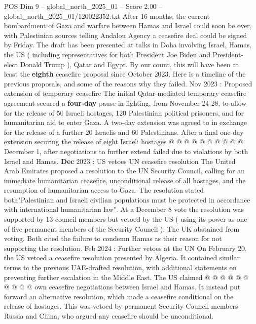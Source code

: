 \begin{textsample}{POS Dim 9 – global\_north\_2025\_01 – Score 2.00 – global\_north\_2025\_01/120022352.txt}  \label{ex:f9_pos_351}
After 16 months, the current bombardment of Gaza and warfare between Hamas and Israel could soon be over, with Palestinian sources telling Andalou Agency a ceasefire deal could be signed by Friday.
The draft has been presented at talks in Doha involving Israel, Hamas, the US ( including representatives for both President Joe Biden and President-elect Donald Trump ), Qatar and Egypt.
By our count, this will have been at least the \textbf{eighth} ceasefire proposal since October 2023.
Here is a timeline of the previous proposals, and some of the reasons why they failed.
Nov 2023 : Proposed extension of temporary ceasefire The initial Qatar-mediated temporary ceasefire agreement secured a \textbf{four-day} pause in fighting, from November 24-28, to allow for the release of 50 Israeli hostages, 120 Palestinian political prisoners, and for humanitarian aid to enter Gaza.
A two-day extension was agreed to in exchange for the release of a further 20 Israelis and 60 Palestinians.
After a final one-day extension securing the release of eight Israeli hostages @ @ @ @ @ @ @ @ @ @ December 1, after negotiations to further extend failed due to violations by both Israel and Hamas. \textbf{Dec} 2023 : US vetoes UN ceasefire resolution The United Arab Emirates proposed a resolution to the UN Security Council, calling for an immediate humanitarian ceasefire, unconditional release of all hostages, and the resumption of humanitarian access to Gaza.
The resolution stated both"Palestinian and Israeli civilian populations must be protected in accordance with international humanitarian law".
At a December 8 vote the resolution was supported by 13 council members but vetoed by the US ( using its power as one of five permanent members of the Security Council ).
The UK abstained from voting.
Both cited the failure to condemn Hamas as their reason for not supporting the resolution.
Feb 2024 : Further vetoes at the UN On February 20, the US vetoed a ceasefire resolution presented by Algeria.
It contained similar terms to the previous UAE-drafted resolution, with additional statements on preventing further escalation in the Middle East.
The US claimed @ @ @ @ @ @ @ @ @ @ own ceasefire negotiations between Israel and Hamas.
It instead put forward an alternative resolution, which made a ceasefire conditional on the release of hostages.
This was vetoed by permanent Security Council members Russia and China, who argued any ceasefire should be unconditional.

\end{textsample}
